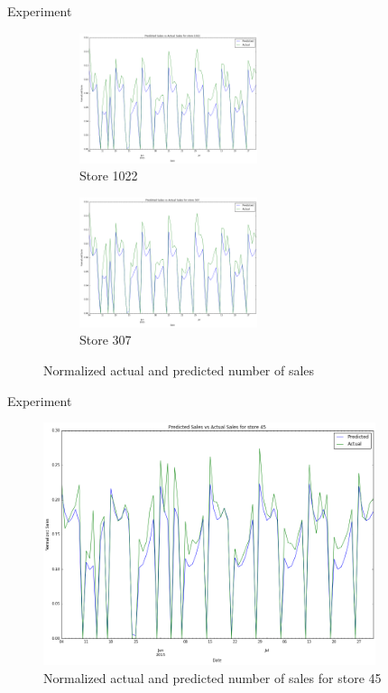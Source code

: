 \documentclass[10pt]{beamer}
\begin{document}
\begin{frame}{Experiment}
    \begin{figure}[t!]
        \centering
        \begin{subfigure}[t]{0.5\textwidth}
            \centering
            \includegraphics[height=1.5in]{rossmann_prediction_errors_store1022}
            \caption{Store 1022}
        \end{subfigure}%
        \begin{subfigure}[t]{0.5\textwidth}
            \centering
            \includegraphics[height=1.5in]{rossmann_prediction_errors_store307}
            \caption{Store 307}
        \end{subfigure}
        \label{fig:sub1}
        \caption{Normalized actual and predicted number of sales}
    \end{figure}
\end{frame}

\begin{frame}{Experiment}
    \begin{figure}[t!]
        \centering
        \includegraphics[height=2.8in]{rossmann_prediction_errors_store45}
        \caption{Normalized actual and predicted number of sales for store 45}
    \end{figure}
\end{frame}
\end{document}
